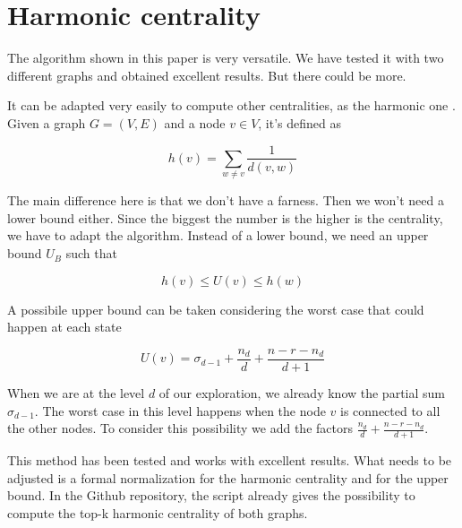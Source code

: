\section{Harmonic centrality}

The algorithm shown in this paper is very versatile. We have tested it with two different graphs and obtained excellent results. But there could be more.

\s \nd It can be adapted very easily to compute other centralities, as the harmonic one \cite{2000}. Given a graph $G = (V,E)$ and a node $v \in V$, it's defined as

\begin{equation}
    h(v) = \sum_{w \neq v} \frac{1}{d(v,w)}
\end{equation}

\nd The main difference here is that we don't have a farness. Then we won't need a lower bound either. Since the biggest the number is the higher is the centrality, we have to adapt the algorithm. Instead of a lower bound, we need an upper bound $U_B$ such that

\begin{equation}
    h(v) \leq U(v) \leq h(w)
\end{equation}

\nd A possibile upper bound can be taken considering the worst case that could happen at each state

\begin{equation}
    U(v) = \sigma_{d-1} + \frac{n_d}{d} + \frac{n - r - n_d}{d+1}
\end{equation}

\nd When we are at the level $d$ of our exploration, we already know the partial sum $\sigma_{d-1}$. The worst case in this level happens when the node $v$ is connected to all the other nodes. To consider this possibility we add the factors $\frac{n_d}{d} + \frac{n - r - n_d}{d+1}$.

\s \nd This method has been tested and works with excellent results. What needs to be adjusted is a formal normalization for the harmonic centrality and for the upper bound. In the Github repository, the script already gives the possibility to compute the top-k harmonic centrality of both graphs.
